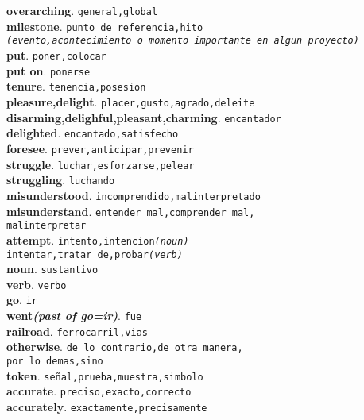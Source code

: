 \documentclass[twocolumn]{article}
\begin{document}
	\textsf{\textbf{overarching}}. \texttt{general,global}\\
	\textsf{\textbf{milestone}}. \texttt{punto de referencia,hito\\{\scriptsize \textsl{(evento,acontecimiento o momento importante en algun proyecto)}}}\\
	\textsf{\textbf{put}}. \texttt{poner,colocar}\\
	\textsf{\textbf{put on}}. \texttt{ponerse}\\
	\textsf{\textbf{tenure}}. \texttt{tenencia,posesion}\\
	\textsf{\textbf{pleasure,delight}}. \texttt{placer,gusto,agrado,deleite}\\
	\textsf{\textbf{disarming,delighful,pleasant,charming}}. \texttt{encantador}\\
	\textsf{\textbf{delighted}}. \texttt{encantado,satisfecho}\\
	\textsf{\textbf{foresee}}. \texttt{prever,anticipar,prevenir}\\
	\textsf{\textbf{struggle}}. \texttt{luchar,esforzarse,pelear}\\
	\textsf{\textbf{struggling}}. \texttt{luchando}\\
	\textsf{\textbf{misunderstood}}. \texttt{incomprendido,malinterpretado}\\
	\textsf{\textbf{misunderstand}}. \texttt{entender mal,comprender mal,\\malinterpretar}\\
	\textsf{\textbf{attempt}}. \texttt{intento,intencion{\scriptsize \textsl{(noun)}}\\intentar,tratar de,probar{\scriptsize \textsl{(verb)}}}\\
	\textsf{\textbf{noun}}. \texttt{sustantivo}\\
	\textsf{\textbf{verb}}. \texttt{verbo}\\
	\textsf{\textbf{go}}. \texttt{ir}\\
	\textsf{\textbf{went{\scriptsize \textsl{(past of go=ir)}}}}. \texttt{fue}\\
	\textsf{\textbf{railroad}}. \texttt{ferrocarril,vias}\\
	\textsf{\textbf{otherwise}}. \texttt{de lo contrario,de otra manera,\\por lo demas,sino}\\
	\textsf{\textbf{token}}. \texttt{se\~nal,prueba,muestra,simbolo}\\
	\textsf{\textbf{accurate}}. \texttt{preciso,exacto,correcto}\\
	\textsf{\textbf{accurately}}. \texttt{exactamente,precisamente}\\
\end{document}
